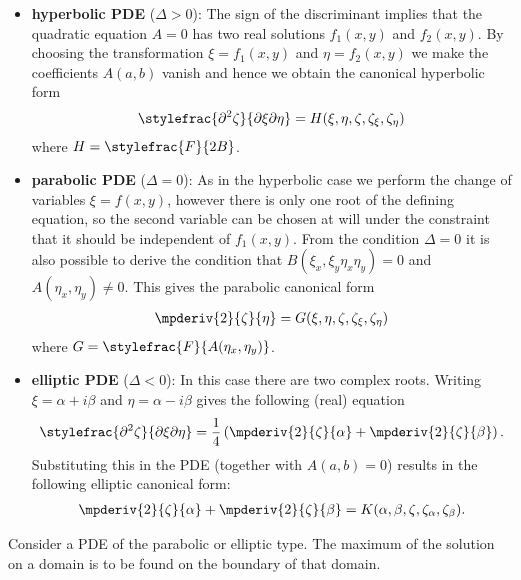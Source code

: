 {        \begin{itemize}
            \item \textbf{hyperbolic PDE} ($\Delta>0$): The sign of the discriminant implies that the quadratic equation $A=0$ has two real solutions $f_1(x, y)$ and $f_2(x, y)$. By choosing the transformation $\xi=f_1(x, y)$ and $\eta=f_2(x, y)$ we make the coefficients $A(a,b)$ vanish and hence we obtain the canonical hyperbolic form
                \begin{gather}
                    \label{pde:hyperbolic_canonical_form}
                    \stylefrac{\partial^2\zeta}{\partial\xi\partial\eta} = H(\xi,\eta,\zeta,\zeta_\xi,\zeta_\eta)
                \end{gather}
                where $H = \stylefrac{F}{2B}$.
            \item \textbf{parabolic PDE} ($\Delta=0$): As in the hyperbolic case we perform the change of variables $\xi = f(x, y)$, however there is only one root of the defining equation, so the second variable can be chosen at will under the constraint that it should be independent of $f_1(x, y)$. From the condition $\Delta=0$ it is also possible to derive the condition that $B(\xi_x,\xi_y\eta_x\eta_y) = 0$ and $A(\eta_x,\eta_y)\neq0$. This gives the parabolic canonical form
                \begin{gather}
                    \label{pde:parabolic_canonical_form}
                    \mpderiv{2}{\zeta}{\eta} = G(\xi,\eta,\zeta,\zeta_\xi,\zeta_\eta)
                \end{gather}
                where $G = \stylefrac{F}{A(\eta_x,\eta_y)}$.
            \item \textbf{elliptic PDE} ($\Delta<0$): In this case there are two complex roots. Writing $\xi = \alpha + i\beta$ and $\eta = \alpha - i\beta$ gives the following (real) equation \[\stylefrac{\partial^2\zeta}{\partial\xi\partial\eta} = \frac{1}{4}\left(\mpderiv{2}{\zeta}{\alpha} + \mpderiv{2}{\zeta}{\beta}\right).\] Substituting this in the PDE (together with $A(a,b)=0$) results in the following elliptic canonical form:
                \begin{gather}
                    \label{pde:elliptic_canonical_form}
                    \mpderiv{2}{\zeta}{\alpha} + \mpderiv{2}{\zeta}{\beta} = K(\alpha,\beta,\zeta,\zeta_\alpha,\zeta_\beta).
                \end{gather}
        \end{itemize}
    }

    \begin{theorem}\label{pde:theorem:maximum_principle}
        Consider a PDE of the parabolic or elliptic type. The maximum of the solution on a domain is to be found on the boundary of that domain.
    \end{theorem}

